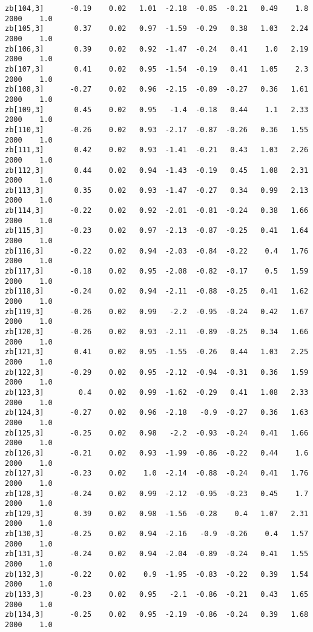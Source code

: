 \documentclass[11pt]{article}
\begin{document}
\begin{Verbatim}[commandchars=\\\{\}]
zb[104,3]      -0.19    0.02   1.01  -2.18  -0.85  -0.21   0.49    1.8   2000    1.0
zb[105,3]       0.37    0.02   0.97  -1.59  -0.29   0.38   1.03   2.24   2000    1.0
zb[106,3]       0.39    0.02   0.92  -1.47  -0.24   0.41    1.0   2.19   2000    1.0
zb[107,3]       0.41    0.02   0.95  -1.54  -0.19   0.41   1.05    2.3   2000    1.0
zb[108,3]      -0.27    0.02   0.96  -2.15  -0.89  -0.27   0.36   1.61   2000    1.0
zb[109,3]       0.45    0.02   0.95   -1.4  -0.18   0.44    1.1   2.33   2000    1.0
zb[110,3]      -0.26    0.02   0.93  -2.17  -0.87  -0.26   0.36   1.55   2000    1.0
zb[111,3]       0.42    0.02   0.93  -1.41  -0.21   0.43   1.03   2.26   2000    1.0
zb[112,3]       0.44    0.02   0.94  -1.43  -0.19   0.45   1.08   2.31   2000    1.0
zb[113,3]       0.35    0.02   0.93  -1.47  -0.27   0.34   0.99   2.13   2000    1.0
zb[114,3]      -0.22    0.02   0.92  -2.01  -0.81  -0.24   0.38   1.66   2000    1.0
zb[115,3]      -0.23    0.02   0.97  -2.13  -0.87  -0.25   0.41   1.64   2000    1.0
zb[116,3]      -0.22    0.02   0.94  -2.03  -0.84  -0.22    0.4   1.76   2000    1.0
zb[117,3]      -0.18    0.02   0.95  -2.08  -0.82  -0.17    0.5   1.59   2000    1.0
zb[118,3]      -0.24    0.02   0.94  -2.11  -0.88  -0.25   0.41   1.62   2000    1.0
zb[119,3]      -0.26    0.02   0.99   -2.2  -0.95  -0.24   0.42   1.67   2000    1.0
zb[120,3]      -0.26    0.02   0.93  -2.11  -0.89  -0.25   0.34   1.66   2000    1.0
zb[121,3]       0.41    0.02   0.95  -1.55  -0.26   0.44   1.03   2.25   2000    1.0
zb[122,3]      -0.29    0.02   0.95  -2.12  -0.94  -0.31   0.36   1.59   2000    1.0
zb[123,3]        0.4    0.02   0.99  -1.62  -0.29   0.41   1.08   2.33   2000    1.0
zb[124,3]      -0.27    0.02   0.96  -2.18   -0.9  -0.27   0.36   1.63   2000    1.0
zb[125,3]      -0.25    0.02   0.98   -2.2  -0.93  -0.24   0.41   1.66   2000    1.0
zb[126,3]      -0.21    0.02   0.93  -1.99  -0.86  -0.22   0.44    1.6   2000    1.0
zb[127,3]      -0.23    0.02    1.0  -2.14  -0.88  -0.24   0.41   1.76   2000    1.0
zb[128,3]      -0.24    0.02   0.99  -2.12  -0.95  -0.23   0.45    1.7   2000    1.0
zb[129,3]       0.39    0.02   0.98  -1.56  -0.28    0.4   1.07   2.31   2000    1.0
zb[130,3]      -0.25    0.02   0.94  -2.16   -0.9  -0.26    0.4   1.57   2000    1.0
zb[131,3]      -0.24    0.02   0.94  -2.04  -0.89  -0.24   0.41   1.55   2000    1.0
zb[132,3]      -0.22    0.02    0.9  -1.95  -0.83  -0.22   0.39   1.54   2000    1.0
zb[133,3]      -0.23    0.02   0.95   -2.1  -0.86  -0.21   0.43   1.65   2000    1.0
zb[134,3]      -0.25    0.02   0.95  -2.19  -0.86  -0.24   0.39   1.68   2000    1.0

\end{Verbatim}
\end{document}
